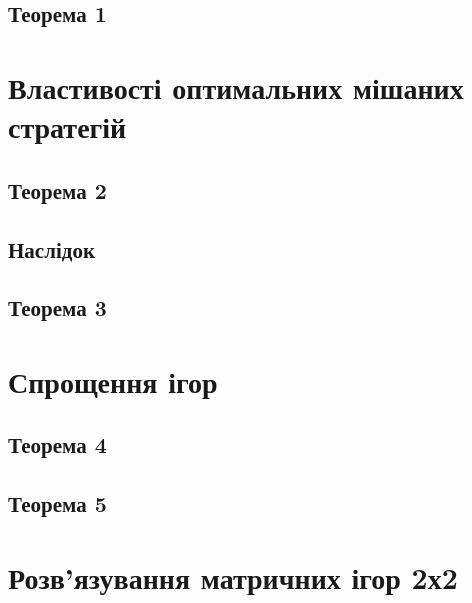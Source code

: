 \documentclass[12pt]{book}
\begin{document}
\subsection{Теорема 1}
\section{Властивості оптимальних мішаних стратегій}
\subsection{Теорема 2}
\subsection{Наслідок}
\subsection{Теорема 3}
\section{Спрощення ігор}
\subsection{Теорема 4}
\subsection{Теорема 5}
\section{Розв’язування матричних ігор 2х2}
\end{document}

